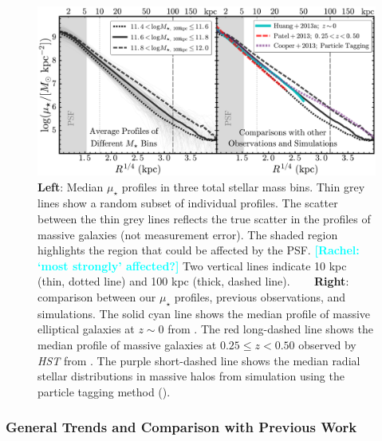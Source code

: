 \documentclass[a4paper,fleqn,usenatbib]{mnras}
\def\mden{{$\mu_{\star}$}}
\newcommand{\rachel}[1]{\textcolor{cyan}{\textbf{[Rachel: #1]}}}
\begin{document}
  \begin{figure}
      \centering 
      \includegraphics[width=\textwidth]{fig/average_mass_profiles_fsps1_A}
      \caption{
          \textbf{Left}: Median \mden{} profiles in three total stellar mass bins. 
              Thin grey lines show a random subset of individual profiles.  The scatter between the thin grey lines reflects the true scatter in the profiles of massive galaxies (not measurement error). The shaded region highlights the region that could be affected by the PSF. \rachel{`most strongly' affected?}
              Two vertical lines indicate 10 kpc (thin, dotted line) and
              100 kpc (thick, dashed line). ~~~ 
          \textbf{Right}: comparison between our \mden{} profiles, previous observations, 
              and simulations. 
              The solid cyan line shows the median profile of massive elliptical 
              galaxies at $z{\sim} 0$ from \citet[][]{Huang2013a}. 
              The red long-dashed line shows the median profile of massive galaxies at 
              $0.25 \leq z < 0.50$ observed by \textit{HST} from \citet[][]{Patel2013}. 
              The purple short-dashed line shows the median radial stellar distributions 
              in massive halos from simulation using the particle tagging method
              (\citealt{Cooper2013}).}
      \label{fig:avg_prof}
  \end{figure}


\subsubsection{General Trends and Comparison with Previous Work}
    \label{sssec:sbp_inter}
          
\end{document}
